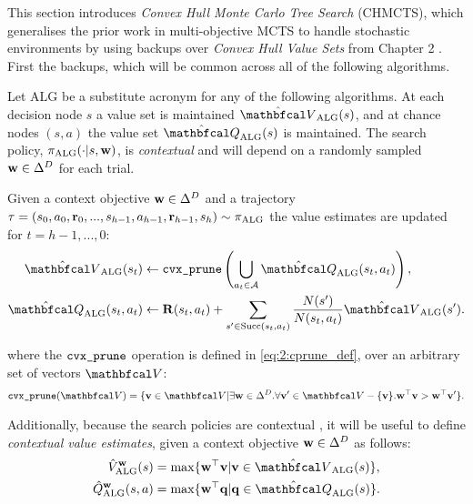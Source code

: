 





    This section introduces \textit{Convex Hull Monte Carlo Tree Search} (CHMCTS), which generalises the prior work in multi-objective MCTS  to handle stochastic environments by using backups over \textit{Convex Hull Value Sets} from Chapter 2 . First the backups, which will be common across all of the following algorithms.

    Let ALG be a substitute acronym for any of the following algorithms. At each decision node $s$ a value set is maintained $\Valg(s)$, and at chance nodes $(s,a)$ the value set $\Qalg(s)$ is maintained. The search policy, ${\pi_{{\textnormal{ALG}}}}(\cdot|s,\mathbf{w})$, is \textit{contextual} and will depend on a randomly sampled $\mathbf{w}\in\Delta^D$ for each trial. 

    Given a context objective $\mathbf{w}\in\Delta^D$ and a trajectory $\tau=(s_0,a_0,\mathbf{r}_0,...,s_{h-1},a_{h-1},\mathbf{r}_{h-1},s_h)\sim{\pi_{{\textnormal{ALG}}}}$  the value estimates are updated for $t=h-1,...,0$:
    \begin{align}
        \Valg(s_t) &\leftarrow \cprune \left( \bigcup_{a_t\in\cl{A}} \Qalg(s_t,a_t) \right), 
            \label{eq:5:chmcts_v_backup} \\
        \Qalg(s_t,a_t) &\leftarrow \bff{R}(s_t,a_t) + \sum_{s'\in\suc{s_t}{a_t}} \frac{N(s')}{N(s_t,a_t)}\Valg(s'). 
            \label{eq:5:chmcts_q_backup}
    \end{align}

    where the ${\textnormal{\texttt{cvx\_prune}}}$ operation is defined in \eqref{eq:2:cprune_def},  over an arbitrary set of vectors $\bfcl{V}$:
    \begin{align}
        \cprune(\bfcl{V}) = \{\bff{v}\in\bfcl{V} | \exists \bff{w}\in\Delta^D. \forall \bff{v}'\in\bfcl{V}-\{\bff{v}\}. \bff{w}^\top \bff{v} > \bff{w}^\top \bff{v}' \}. \label{eq:5:cprune_def}
    \end{align}

    Additionally, because the search policies are contextual , it will be useful to define \textit{contextual value estimates}, given a context objective $\mathbf{w}\in\Delta^D$ as follows:
    \begin{align}
        \Valgctx{\bff{w}}(s) &= \max \{\bff{w}^\top \bff{v} | \bff{v}\in\Valg(s) \}, \label{eq:5:contextual_value} \\
        \Qalgctx{\bff{w}}(s,a) &= \max \{\bff{w}^\top \bff{q} | \bff{q}\in\Qalg(s) \}. \label{eq:5:contextual_qvalue}
    \end{align} 


